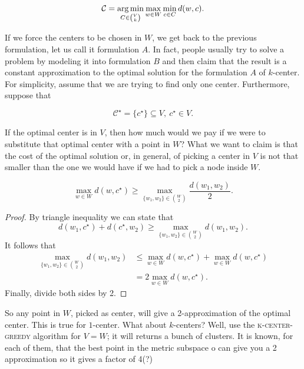 \begin{equation}
	\mathcal{C} = \operatorname*{arg\,min}_{C \in \binom{V}{k}} \max_{w \in W} \min_{c \in C}d(w, c).
\end{equation}

If we force the centers to be chosen in $W$, we get back to the previous formulation, let us call it formulation $A$. In fact, people usually try to solve a problem by modeling it into formulation $B$ and then claim that the result is a constant approximation to the optimal solution for the formulation $A$ of $k$-center. For simplicity, assume that we are trying to find only one center. Furthermore, suppose that 

\begin{equation}
\mathcal{C^\star} = \{c^\star\} \subseteq V,\ c^\star \in V.
\end{equation}

If the optimal center is in $V$, then how much would we pay if we were to substitute that optimal center with a point in $W$? What we want to claim is that the cost of the optimal solution or, in general, of picking a center in $V$ is not that smaller than the one we would have if we had to pick a node inside $W$.

\begin{lem}
	\begin{equation}
	\max_{w \in W} d(w, c^\star) \geq \max_{\{w_1, w_2\} \in \binom{W}{2}} \frac{d(w_1, w_2)}{2}.
	\end{equation}
\end{lem}
\begin{proof} By triangle inequality we can state that
	\begin{equation}
	d(w_1, c^\star) + d(c^\star, w_2) \geq\max_{\{w_1, w_2\} \in \binom{W}{2}} d(w_1, w_2).
	\end{equation}
	It follows that
	\begin{align}
	\max_{\{w_1, w_2\} \in \binom{W}{2}}d(w_1, w_2) &\leq \max_{w \in W} d(w, c^\star) + \max_{w \in W}d(w, c^\star)\\
	& =2\max_{w \in W}d(w, c^\star).
	\end{align}
Finally, divide both sides by 2.
\end{proof}

So any point in $W$, picked as center, will give a 2-approximation of the optimal center. This is true for $1$-center. What about $k$-centers? Well, use the \textsc{k-center-greedy} algorithm for $V = W$; it will returns a bunch of clusters. It is known, for each of them, that the best point in the metric subspace o can give you a 2 approximation so it gives a factor of 4(?)

